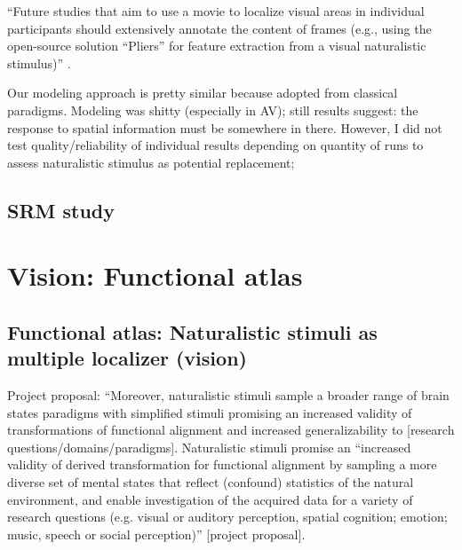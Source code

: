 


%
``Future studies that aim to use a movie to localize visual areas in individual
participants should extensively annotate the content of frames (e.g., using the
open-source solution ``Pliers''\citep{mcnamara2017developing} for feature
extraction from a visual naturalistic stimulus)''
\citep{haeusler2022processing}.

%
Our modeling approach is pretty similar because adopted from classical
paradigms.
%
Modeling was shitty (especially in AV);
%
still results suggest: the response to spatial information must be somewhere in
there.
%
However, I did not test quality/reliability of individual results depending on
quantity of runs to assess naturalistic stimulus as potential replacement;


\subsection{SRM study}





\section{Vision: Functional atlas}




\subsection{Functional atlas: Naturalistic stimuli as multiple localizer
(vision)}


Project proposal: ``Moreover, naturalistic stimuli sample a broader range of
brain states paradigms with simplified stimuli \citep{guntupalli2016model,
haxby2011common} promising an increased validity of transformations of
functional alignment and increased generalizability to [research
questions/domains/paradigms].
%
Naturalistic stimuli promise an ``increased validity of derived transformation
for functional alignment by sampling a more diverse set of mental states that
reflect (confound) statistics of the natural environment, and enable
investigation of the acquired data for a variety of research questions (e.g.
visual or auditory perception, spatial cognition; emotion; music, speech or
social perception)'' [project proposal].


